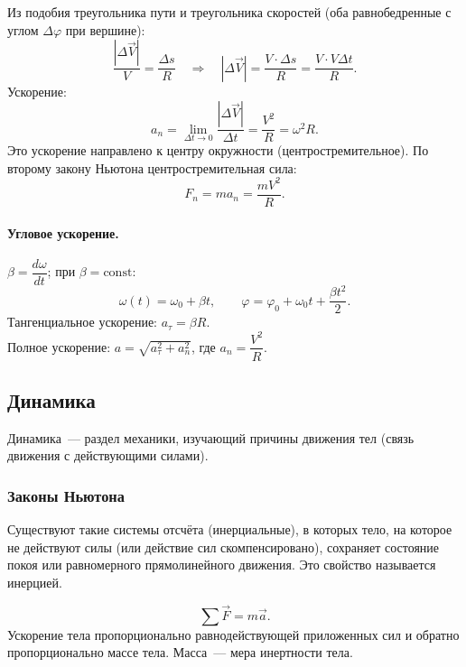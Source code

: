 \documentclass[12pt]{article}
\begin{document}
Из подобия треугольника пути и треугольника скоростей (оба равнобедренные с углом $\Delta\varphi$ при вершине):
\[
	\frac{|\Delta \vec{V}|}{V} = \frac{\Delta s}{R} \quad \Longrightarrow \quad |\Delta \vec{V}| = \frac{V \cdot \Delta s}{R} = \frac{V \cdot V \Delta t}{R}.
\]
Ускорение:
\[
	a_n = \lim_{\Delta t \to 0} \frac{|\Delta \vec{V}|}{\Delta t} = \frac{V^2}{R} = \omega^2 R.
\]
Это ускорение направлено к центру окружности (центростремительное). По второму закону Ньютона центростремительная сила:
\[
	F_n = ma_n = \frac{mV^2}{R}.
\]

\paragraph{Угловое ускорение.}
$\beta = \dfrac{d\omega}{dt}$; при $\beta = \mathrm{const}$:
\[
	\omega(t) = \omega_0 + \beta t, \qquad \varphi = \varphi_0 + \omega_0 t + \frac{\beta t^2}{2}.
\]
Тангенциальное ускорение: $a_\tau = \beta R$.\\
Полное ускорение: $a = \sqrt{a_\tau^2 + a_n^2}$, где $a_n = \dfrac{V^2}{R}$.

\subsection{Динамика}

\begin{definition}
	Динамика~--- раздел механики, изучающий причины движения тел (связь движения с действующими силами).
\end{definition}

\subsubsection{Законы Ньютона}

\begin{definition}
	Существуют такие системы отсчёта (инерциальные), в которых тело, на которое не действуют силы (или действие сил скомпенсировано), сохраняет состояние покоя или равномерного прямолинейного движения. Это свойство называется инерцией.
\end{definition}

\begin{definition}
	\[
		\sum \vec{F} = m \vec{a}.
	\]
	Ускорение тела пропорционально равнодействующей приложенных сил и обратно пропорционально массе тела. Масса~--- мера инертности тела.
\end{definition}
\end{document}
